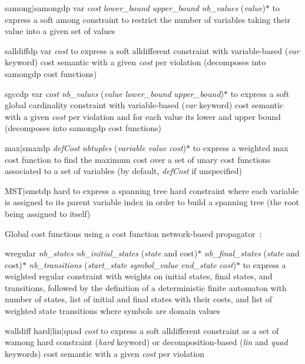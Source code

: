 \documentclass{article}
\begin{document}
\begin{DoxyItemize}
\begin{DoxyItemize}
\item samong$\vert$samongdp var {\itshape cost} {\itshape lower\-\_\-bound} {\itshape upper\-\_\-bound} {\itshape nb\-\_\-values} ({\itshape value})$\ast$ to express a soft among constraint to restrict the number of variables taking their value into a given set of values
\item salldiffdp var {\itshape cost} to express a soft alldifferent constraint with variable-\/based ({\itshape var} keyword) cost semantic with a given {\itshape cost} per violation (decomposes into samongdp cost functions)
\item sgccdp var {\itshape cost} {\itshape nb\-\_\-values} ({\itshape value} {\itshape lower\-\_\-bound} {\itshape upper\-\_\-bound})$\ast$ to express a soft global cardinality constraint with variable-\/based ({\itshape var} keyword) cost semantic with a given {\itshape cost} per violation and for each value its lower and upper bound (decomposes into samongdp cost functions)
\item max$\vert$smaxdp {\itshape def\-Cost} {\itshape nbtuples} ({\itshape variable} {\itshape value} {\itshape cost})$\ast$ to express a weighted max cost function to find the maximum cost over a set of unary cost functions associated to a set of variables (by default, {\itshape def\-Cost} if unspecified)
\item M\-S\-T$\vert$smstdp hard to express a spanning tree hard constraint where each variable is assigned to its parent variable index in order to build a spanning tree (the root being assigned to itself)
\end{DoxyItemize}
\item Global cost functions using a cost function network-\/based propagator\-~\cite{Ficolofo2012}:
\begin{DoxyItemize}
\item wregular {\itshape nb\-\_\-states} {\itshape nb\-\_\-initial\-\_\-states} ({\itshape state} and cost)$\ast$ {\itshape nb\-\_\-final\-\_\-states} ({\itshape state} and cost)$\ast$ {\itshape nb\-\_\-transitions} ({\itshape start\-\_\-state} {\itshape symbol\-\_\-value} {\itshape end\-\_\-state} {\itshape cost})$\ast$ to express a weighted regular constraint with weights on initial states, final states, and transitions, followed by the definition of a deterministic finite automaton with number of states, list of initial and final states with their costs, and list of weighted state transitions where symbols are domain values
\item walldiff hard$\vert$lin$\vert$quad {\itshape cost} to express a soft alldifferent constraint as a set of wamong hard constraint ({\itshape hard} keyword) or decomposition-\/based ({\itshape lin} and {\itshape quad} keywords) cost semantic with a given {\itshape cost} per violation

\end{DoxyItemize}
\end{DoxyItemize}
\end{document}
